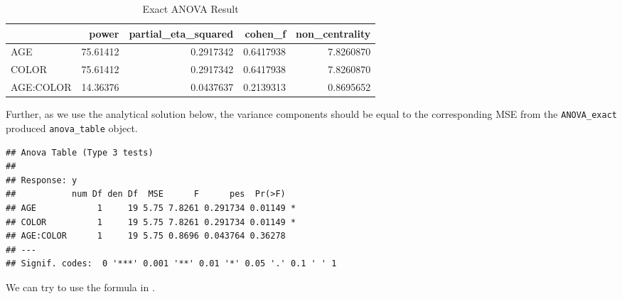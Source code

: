 \documentclass[
]{book}
\newenvironment{Shaded}{\begin{snugshade}}{\end{snugshade}}
\newcommand{\NormalTok}[1]{#1}
\newcommand{\SpecialCharTok}[1]{\textcolor[rgb]{0.00,0.00,0.00}{#1}}
\begin{document}
\begin{table}[!h]

\caption{\label{tab:unnamed-chunk-135}Exact ANOVA Result}
\centering
\begin{tabular}[t]{l|r|r|r|r}
\hline
  & power & partial\_eta\_squared & cohen\_f & non\_centrality\\
\hline
AGE & 75.61412 & 0.2917342 & 0.6417938 & 7.8260870\\
\hline
COLOR & 75.61412 & 0.2917342 & 0.6417938 & 7.8260870\\
\hline
AGE:COLOR & 14.36376 & 0.0437637 & 0.2139313 & 0.8695652\\
\hline
\end{tabular}
\end{table}

Further, as we use the analytical solution below, the variance components should be equal to the corresponding MSE from the \texttt{ANOVA\_exact} produced \texttt{anova\_table} object.

\begin{Shaded}
\end{Shaded}

\begin{verbatim}
## Anova Table (Type 3 tests)
## 
## Response: y
##           num Df den Df  MSE      F      pes  Pr(>F)  
## AGE            1     19 5.75 7.8261 0.291734 0.01149 *
## COLOR          1     19 5.75 7.8261 0.291734 0.01149 *
## AGE:COLOR      1     19 5.75 0.8696 0.043764 0.36278  
## ---
## Signif. codes:  0 '***' 0.001 '**' 0.01 '*' 0.05 '.' 0.1 ' ' 1
\end{verbatim}

We can try to use the formula in \citet{potvin2000statistical}.
\end{document}
